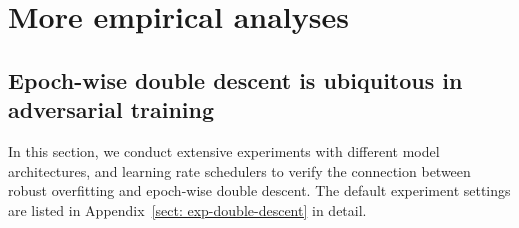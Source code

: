 \section{More empirical analyses}

\subsection{Epoch-wise double descent is ubiquitous in adversarial training}
\label{sect:double-descent-reconcile}


In this section, we conduct extensive experiments with different model architectures, and learning rate schedulers to verify the connection between robust overfitting and epoch-wise double descent. The default experiment settings are listed in Appendix~\ref{sect: exp-double-descent} in detail.






